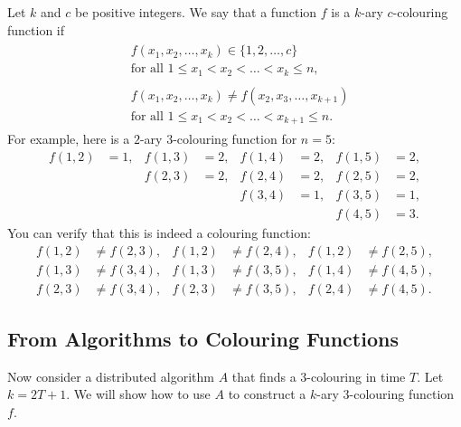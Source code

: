 Let $k$ and $c$ be positive integers. We say that a function $f$ is a $k$-ary $c$-colouring function if
\begin{align}
    \begin{split}
    &f(x_1, x_2, \dotsc, x_k) \in \{1,2,\dotsc,c\} \\
    &\text{for all } 1 \le x_1 < x_2 < \dotso < x_k \le n,
    \end{split}
    \label{eq:linial-col1} \\[3pt]
    \begin{split}
    &f(x_1, x_2, \dotsc, x_k) \ne f(x_2, x_3, \dotsc, x_{k+1}) \\
    &\text{for all } 1 \le x_1 < x_2 < \dotso < x_{k+1} \le n.
    \end{split}
    \label{eq:linial-col2}
\end{align}
For example, here is a $2$-ary $3$-colouring function for $n = 5$:
\begin{align*}
    f(1,2) &= 1, &
    f(1,3) &= 2, &
    f(1,4) &= 2, &
    f(1,5) &= 2, \\&&
    f(2,3) &= 2, &
    f(2,4) &= 2, &
    f(2,5) &= 2, \\&&&&
    f(3,4) &= 1, &
    f(3,5) &= 1, \\&&&&&&
    f(4,5) &= 3.
\end{align*}
You can verify that this is indeed a colouring function:
\begin{align*}
    f(1,2) &\ne f(2,3), &
    f(1,2) &\ne f(2,4), &
    f(1,2) &\ne f(2,5), \\
    f(1,3) &\ne f(3,4), &
    f(1,3) &\ne f(3,5), &
    f(1,4) &\ne f(4,5), \\
    f(2,3) &\ne f(3,4), &
    f(2,3) &\ne f(3,5), &
    f(2,4) &\ne f(4,5).
\end{align*}


\subsection{From Algorithms to Colouring Functions}

Now consider a distributed algorithm $A$ that finds a $3$-colouring in time $T$. Let $k = 2T+1$. We will show how to use $A$ to construct a $k$-ary $3$-colouring function $f$.


